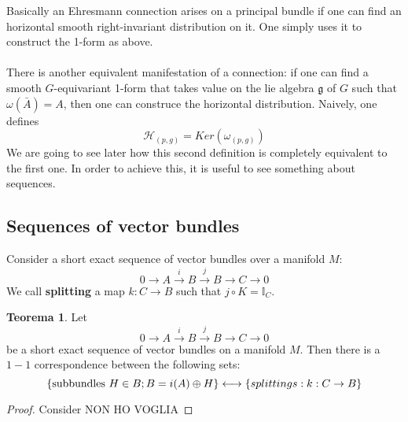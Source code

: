 \documentclass[12pt,a4paper]{report}
\theoremstyle{definition}
\theoremstyle{Theorem}
\newtheorem{Theo}[Def]{Teorema}
\theoremstyle{definition}
\theoremstyle{definition}
\theoremstyle{definition}
\begin{document}
		Basically an Ehresmann connection arises on a principal bundle if one can find an horizontal smooth right-invariant distribution on it. One simply uses it to construct the 1-form as above.\\
		\\
		There is another equivalent manifestation of a connection: if one can find a smooth $G$-equivariant 1-form that takes value on the lie algebra $\mathfrak{g}$ of $G$ such that $\omega(\bar{A})=A$, then one can construce the horizontal distribution. Naively, one defines $$\mathcal{H}_{(p,g)}=Ker(\omega_{(p,g)})$$
		We are going to see later how this second definition is completely equivalent to the first one. In order to achieve this, it is useful to see something about sequences.
		\subsection{Sequences of vector bundles}
		Consider a short exact sequence of vector bundles over a manifold $M$:
		$$0\rightarrow A\xrightarrow{i}B\xrightarrow{j}B\rightarrow C\rightarrow0$$
		We call \textbf{splitting} a map $k:C\rightarrow B$ such that $j\circ K=\mathbb{I}_C$.
		\begin{Theo}
			Let
			$$0\rightarrow A\xrightarrow{i}B\xrightarrow{j}B\rightarrow C\rightarrow0$$
			be a short exact sequence of vector bundles on a manifold $M$. Then there is a $1-1$ correspondence between the following sets:
			$$\{\hbox{subbundles } H\in B;B=i(A)\oplus H\}\longleftrightarrow\{splittings: k:C\rightarrow B\}$$
		\end{Theo}
		\begin{proof}
			Consider NON HO VOGLIA
		\end{proof}
\end{document}
